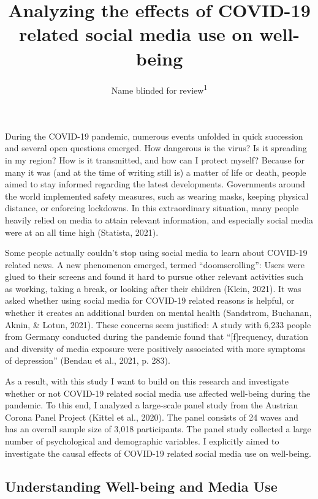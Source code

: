 \documentclass[
  man,mask]{apa6}
\title{Analyzing the effects of COVID-19 related social media use on well-being}
\author{Name blinded for review\textsuperscript{1}}
\date{}
\affiliation{\vspace{0.5cm}\textsuperscript{1} }
\begin{document}
\maketitle

During the COVID-19 pandemic,
numerous events unfolded in quick succession and several open questions emerged.
How dangerous is the virus?
Is it spreading in my region?
How is it transmitted, and how can I protect myself?
Because for many it was (and at the time of writing still is) a matter of life or death, people aimed to stay informed regarding the latest developments.
Governments around the world implemented safety measures, such as wearing masks, keeping physical distance, or enforcing lockdowns.
In this extraordinary situation, many people heavily relied on media to attain relevant information, and especially social media were at an all time high (Statista, 2021).

Some people actually couldn't stop using social media to learn about COVID-19 related news.
A new phenomenon emerged, termed ``doomscrolling'':
Users were glued to their screens and found it hard to pursue other relevant activities such as working, taking a break, or looking after their children (Klein, 2021).
It was asked whether using social media for COVID-19 related reasons is helpful, or whether it creates an additional burden on mental health (Sandstrom, Buchanan, Aknin, \& Lotun, 2021).
These concerns seem justified:
A study with 6,233 people from Germany conducted during the pandemic found that ``{[}f{]}requency, duration and diversity of media exposure were positively associated with more symptoms of depression'' (Bendau et al., 2021, p. 283).

As a result, with this study I want to build on this research and investigate whether or not COVID-19 related social media use affected well-being during the pandemic.
To this end, I analyzed a large-scale panel study from the Austrian Corona Panel Project (Kittel et al., 2020).
The panel consists of 24 waves and has an overall sample size of 3,018 participants.
The panel study collected a large number of psychological and demographic variables.
I explicitly aimed to investigate the causal effects of COVID-19 related social media use on well-being.

\hypertarget{understanding-well-being-and-media-use}{%
\subsection{Understanding Well-being and Media Use}\label{understanding-well-being-and-media-use}}
\end{document}
